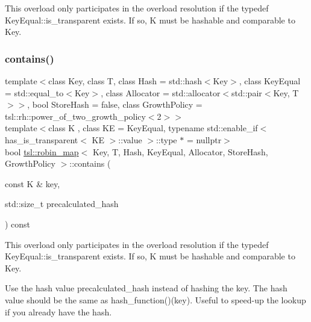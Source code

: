 This overload only participates in the overload resolution if the typedef Key\+Equal\+::is\+\_\+transparent exists. If so, K must be hashable and comparable to Key. \mbox{\label{classtsl_1_1robin__map_a68ddefdb66a67d002acfafd0ef39113a}} 
\subsubsection{\texorpdfstring{contains()}{contains()}\hspace{0.1cm}{\footnotesize\ttfamily [3/3]}}
{\footnotesize\ttfamily template$<$class Key, class T, class Hash = std\+::hash$<$\+Key$>$, class Key\+Equal = std\+::equal\+\_\+to$<$\+Key$>$, class Allocator = std\+::allocator$<$std\+::pair$<$\+Key, T$>$$>$, bool Store\+Hash = false, class Growth\+Policy = tsl\+::rh\+::power\+\_\+of\+\_\+two\+\_\+growth\+\_\+policy$<$2$>$$>$ \\
template$<$class K , class KE  = Key\+Equal, typename std\+::enable\+\_\+if$<$ has\+\_\+is\+\_\+transparent$<$ K\+E $>$\+::value $>$\+::type $\ast$  = nullptr$>$ \\
bool \mbox{\hyperlink{classtsl_1_1robin__map}{tsl\+::robin\+\_\+map}}$<$ Key, T, Hash, Key\+Equal, Allocator, Store\+Hash, Growth\+Policy $>$\+::contains (\begin{DoxyParamCaption}\item[{const K \&}]{key,  }\item[{std\+::size\+\_\+t}]{precalculated\+\_\+hash }\end{DoxyParamCaption}) const\hspace{0.3cm}{\ttfamily [inline]}}





This overload only participates in the overload resolution if the typedef Key\+Equal\+::is\+\_\+transparent exists. If so, K must be hashable and comparable to Key.

Use the hash value \textquotesingle{}precalculated\+\_\+hash\textquotesingle{} instead of hashing the key. The hash value should be the same as hash\+\_\+function()(key). Useful to speed-\/up the lookup if you already have the hash. \mbox{\label{classtsl_1_1robin__map_a26bcd048ce6a0217daca1293588dc3d1}} 
